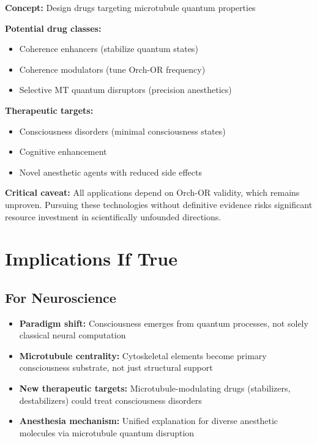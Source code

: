 \textbf{Concept:} Design drugs targeting microtubule quantum properties

\textbf{Potential drug classes:}
\begin{itemize}
\item Coherence enhancers (stabilize quantum states)
\item Coherence modulators (tune Orch-OR frequency)
\item Selective MT quantum disruptors (precision anesthetics)
\end{itemize}

\textbf{Therapeutic targets:}
\begin{itemize}
\item Consciousness disorders (minimal consciousness states)
\item Cognitive enhancement
\item Novel anesthetic agents with reduced side effects
\end{itemize}

\begin{warningbox}
\textbf{Critical caveat:} All applications depend on Orch-OR validity, which remains unproven. Pursuing these technologies without definitive evidence risks significant resource investment in scientifically unfounded directions.
\end{warningbox}

\section{Implications If True}

\subsection{For Neuroscience}

\begin{itemize}
\item \textbf{Paradigm shift:} Consciousness emerges from quantum processes, not solely classical neural computation
\item \textbf{Microtubule centrality:} Cytoskeletal elements become primary consciousness substrate, not just structural support
\item \textbf{New therapeutic targets:} Microtubule-modulating drugs (stabilizers, destabilizers) could treat consciousness disorders
\item \textbf{Anesthesia mechanism:} Unified explanation for diverse anesthetic molecules via microtubule quantum disruption
\end{itemize}

